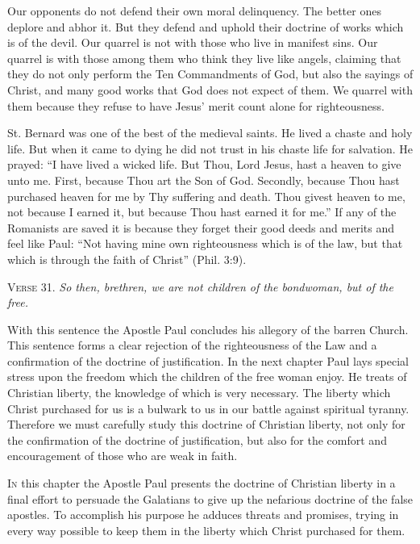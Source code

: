 Our opponents do not defend their own moral delinquency. The better ones deplore and abhor it. But they defend and uphold their doctrine of works which is of the devil. Our quarrel is not with those who live in manifest sins. Our quarrel is with those among them who think they live like angels, claiming that they do not only perform the Ten Commandments of God, but also the sayings of Christ, and many good works that God does not expect of them. We quarrel with them because they refuse to have Jesus’ merit count alone for righteousness.

St. Bernard was one of the best of the medieval saints. He lived a chaste and holy life. But when it came to dying he did not trust in his chaste life for salvation. He prayed: “I have lived a wicked life. But Thou, Lord Jesus, hast a heaven to give unto me. First, because Thou art the Son of God. Secondly, because Thou hast purchased heaven for me by Thy suffering and death. Thou givest heaven to me, not because I earned it, but because Thou hast earned it for me.” If any of the Romanists are saved it is because they forget their good deeds and merits and feel like Paul: “Not having mine own righteousness which is of the law, but that which is through the faith of Christ” (Phil. 3:9).

\textsc{Verse} 31. \emph{So then, brethren, we are not children of the bondwoman, but of the free.}

With this sentence the Apostle Paul concludes his allegory of the barren Church. This sentence forms a clear rejection of the righteousness of the Law and a confirmation of the doctrine of justification. In the next chapter Paul lays special stress upon the freedom which the children of the free woman enjoy. He treats of Christian liberty, the knowledge of which is very necessary. The liberty which Christ purchased for us is a bulwark to us in our battle against spiritual tyranny. Therefore we must carefully study this doctrine of Christian liberty, not only for the confirmation of the doctrine of justification, but also for the comfort and encouragement of those who are weak in faith.


\textsc{In} this chapter the Apostle Paul presents the doctrine of Christian liberty in a final effort to persuade the Galatians to give up the nefarious doctrine of the false apostles. To accomplish his purpose he adduces threats and promises, trying in every way possible to keep them in the liberty which Christ purchased for them.

